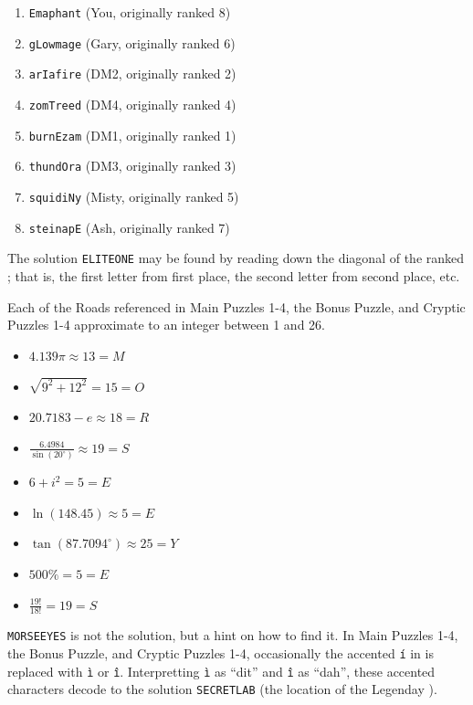 \begin{multicols}{2}
\begin{enumerate}
  \item \texttt{Emaphant} (You, originally ranked 8)
  \item \texttt{gLowmage} (Gary, originally ranked 6)
  \item \texttt{arIafire} (DM2, originally ranked 2)
  \item \texttt{zomTreed} (DM4, originally ranked 4)
  \item \texttt{burnEzam} (DM1, originally ranked 1)
  \item \texttt{thundOra} (DM3, originally ranked 3)
  \item \texttt{squidiNy} (Misty, originally ranked 5)
  \item \texttt{steinapE} (Ash, originally ranked 7)
\end{enumerate}
\end{multicols}

The solution \texttt{ELITEONE} may be found by reading down the diagonal of the
ranked \mappMobimon{}; that is, the first letter from first place, the second
letter from second place, etc.


Each of the Roads referenced in Main Puzzles 1-4, the Bonus Puzzle,
and Cryptic Puzzles 1-4 approximate to an integer between 1 and 26.

\begin{multicols}{3}
\begin{itemize}
  \item \(4.139\pi\approx13=M\)
  \item \(\sqrt{9^2+12^2}=15=O\)
  \item \(20.7183-e\approx18=R\)
  \item \(\frac{6.4984}{\sin(20^\circ)}\approx19=S\)
  \item \(6+i^2=5=E\)
  \item \(\ln(148.45)\approx5=E\)
  \item \(\tan(87.7094^\circ)\approx25=Y\)
  \item \(500\%=5=E\)
  \item \(\frac{19!}{18!}=19=S\)
\end{itemize}
\end{multicols}

\texttt{MORSEEYES} is not the solution, but a hint on how to find it.
In Main Puzzles 1-4, the Bonus Puzzle, and Cryptic Puzzles 1-4, occasionally
the accented \texttt{\'i} in \mappMobimon{} is replaced with
\texttt{\`i} or \texttt{\^i}. Interpretting \texttt{\`i} as ``dit'' and
\texttt{\^i} as ``dah'', these accented characters decode to the solution
\texttt{SECRETLAB} (the location of the Legenday \mappMobimon{}).

